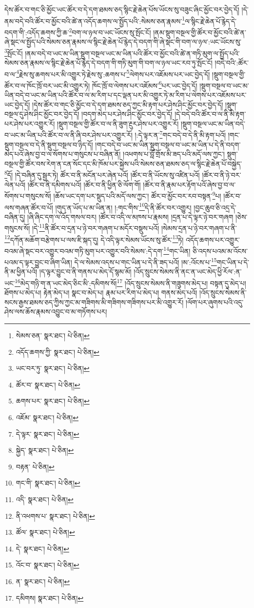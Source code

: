 དེས་ཚོར་བ་གང་ཅི་མྱོང་ཡང་ཚོར་བ་དེ་དག་ཐམས་ཅད་སྙིང་རྗེ་ཆེན་པོས་ཡོངས་སུ་བཟུང་ཞིང་མྱོང་བར་བྱེད་དོ། །དེ་ནམ་བདེ་བའི་ཚོར་བ་མྱོང་བའི་ཚེ་ན་འདོད་ཆགས་ལ་སྤྱོད་པའི་:སེམས་ཅན་རྣམས་\footnote{སེམས་ཅན་  སྣར་ཐང་།  པེ་ཅིན། }ལ་སྙིང་རྗེ་ཆེན་པོ་རྙེད་དེ་བདག་གི་:འདོད་ཆགས་ཀྱི་ཆ་\footnote{འདོད་ཆགས་ཀྱི་  སྣར་ཐང་།  པེ་ཅིན། }བག་ལ་ཉལ་བ་ཡང་ཡོངས་སུ་སྤོང་ངོ། །ནམ་སྡུག་བསྔལ་གྱི་ཚོར་བ་མྱོང་བའི་ཚེ་ན་ཞེ་སྡང་ལ་སྤྱོད་པའི་སེམས་ཅན་རྣམས་ལ་སྙིང་རྗེ་ཆེན་པོ་རྙེད་དེ་བདག་གི་ཞེ་སྡང་གི་བག་ལ་ཉལ་:ཡང་ཡོངས་སུ་\footnote{ཡང་བར་ཏུ་  སྣར་ཐང་།  པེ་ཅིན། }སྤོང་ངོ། །ནམ་བདེ་བ་ཡང་མ་ཡིན་སྡུག་བསྔལ་ཡང་མ་ཡིན་པའི་ཚོར་བ་མྱོང་བའི་ཚེ་ན་གཏི་མུག་ལ་སྤྱོད་པའི་སེམས་ཅན་རྣམས་ལ་སྙིང་རྗེ་ཆེན་པོ་རྙེད་དེ་བདག་གི་གཏི་མུག་གི་བག་ལ་ཉལ་ཡང་རབ་ཏུ་སྤོང་ངོ། །བདེ་བའི་:ཚོར་བ་ལ་\footnote{ཚོར་བ་  སྣར་ཐང་།  པེ་ཅིན། }རྗེས་སུ་ཆགས་པར་མི་འགྱུར་ཏེ་རྗེས་སུ་:ཆགས་པ་\footnote{ཆགས་པར་  སྣར་ཐང་།  པེ་ཅིན། }ལེགས་པར་འཇོམས་པར་ཡང་བྱེད་དོ། །སྡུག་བསྔལ་གྱི་ཚོར་བ་ལ་ཁོང་ཁྲོ་བར་ཡང་མི་འགྱུར་ཏེ། ཁོང་ཁྲོ་བ་ལེགས་པར་འཇོམས་\footnote{འཇོམ་  སྣར་ཐང་།  པེ་ཅིན། }པར་ཡང་བྱེད་དོ། །སྡུག་བསྔལ་བ་ཡང་མ་ཡིན་བདེ་བ་ཡང་མ་ཡིན་པའི་ཚོར་བ་ལ་མ་རིག་པ་དང་ལྡན་པར་མི་འགྱུར་ཏེ་མ་རིག་པ་ལེགས་པར་འཇོམས་པར་ཡང་བྱེད་དོ། །དེས་ཚོར་བ་གང་ཅི་མྱོང་བ་དེ་དག་ཐམས་ཅད་ཀྱང་མི་རྟག་པར་ཤེས་ཤིང་མྱོང་བར་བྱེད་དོ། །སྡུག་བསྔལ་དུ་ཤེས་ཤིང་མྱོང་བར་བྱེད་དོ། །བདག་མེད་པར་ཤེས་ཤིང་མྱོང་བར་བྱེད་དོ། །དེ་བདེ་བའི་ཚོར་བ་ལ་ནི་མི་རྟག་པར་ཤེས་པར་འགྱུར་རོ། །སྡུག་བསྔལ་གྱི་ཚོར་བ་ལ་ནི་ཟུག་རྔུར་ཤེས་པར་འགྱུར་རོ། །སྡུག་བསྔལ་ཡང་མ་ཡིན་བདེ་བ་ཡང་མ་ཡིན་པའི་ཚོར་བ་ལ་ནི་ཞི་བར་ཤེས་པར་འགྱུར་རོ། །:དེ་ལྟར་ན་\footnote{དེ་ལྟར་  སྣར་ཐང་།  པེ་ཅིན། }གང་བདེ་བ་དེ་ནི་མི་རྟག་པའོ། །གང་སྡུག་བསྔལ་བ་དེ་ནི་སྡུག་བསྔལ་བ་ཉིད་དོ། །གང་བདེ་བ་ཡང་མ་ཡིན་སྡུག་བསྔལ་བ་ཡང་མ་ཡིན་པ་དེ་ནི་བདག་མེད་པའོ་ཞེས་བྱ་བ་ལ་སོགས་པ་གསུངས་པ་བཞིན་ནོ། །འཕགས་པ་བློ་གྲོས་མི་ཟད་པའི་མདོ་ལས་ཀྱང་། སྡུག་བསྔལ་གྱི་ཚོར་བས་རེག་ན་ངན་སོང་དང་མི་ཁོམ་པར་སྐྱེས་པའི་སེམས་ཅན་ཐམས་ཅད་ལ་སྙིང་རྗེ་ཆེན་པོ་བསྐྱེད་\footnote{སྐྱེད་  སྣར་ཐང་།  པེ་ཅིན། }དོ། །དེ་བཞིན་དུ་སྦྱར་ཏེ། ཚོར་བ་ནི་མངོན་པར་ཞེན་པའོ། །ཚོར་བ་ནི་ཡོངས་སུ་འཛིན་པའོ། །ཚོར་བ་ནི་ཉེ་བར་ལེན་པའོ། །ཚོར་བ་ནི་དམིགས་པའོ། །ཚོར་བ་ནི་ཕྱིན་ཅི་ལོག་གོ། །ཚོར་བ་ནི་རྣམ་པར་རྟོག་པའོ་ཞེས་བྱ་བ་ལ་སོགས་པ་གསུངས་སོ། །ཆོས་ཡང་དག་པར་སྡུད་པའི་མདོ་ལས་ཀྱང་། ཚོར་བ་མྱོང་བར་རབ་བསྟན་\footnote{བརྟན་  པེ་ཅིན། }པ། །ཚོར་བ་ལས་གཞན་ཚོར་བ་པོ། །གུད་ན་ཡོད་པ་མ་ཡིན་ན། །:གང་གིས་\footnote{གང་གི་  སྣར་ཐང་།  པེ་ཅིན། }དེ་ནི་ཚོར་བར་འགྱུར། །བྱང་ཆུབ་ཅི་འདྲ་དེ་བཞིན་དུ། །ཞི་ཞིང་དག་ལ་འོད་གསལ་བར། །ཚོར་བ་འདི་ལ་མཁས་པ་རྣམས། །དྲན་པ་དེ་ལྟར་ཉེ་བར་གཞག །ཅེས་གསུངས་སོ། །དེ་\footnote{འདི་  སྣར་ཐང་།  པེ་ཅིན། }ནི་ཚོར་བ་དྲན་པ་ཉེ་བར་གཞག་པ་མདོར་བསྡུས་པའོ། །སེམས་དྲན་པ་ཉེ་བར་གཞག་པ་ནི་\footnote{ནི་འཕགས་པ་  སྣར་ཐང་།  པེ་ཅིན། }དཀོན་མཆོག་བརྩེགས་པ་ལས་ཇི་སྐད་དུ། དེ་འདི་ལྟར་སེམས་ཡོངས་སུ་ཚོར་\footnote{ཚོལ་  སྣར་ཐང་།  པེ་ཅིན། }ཏེ། འདོད་ཆགས་པར་འགྱུར་བའམ་ཞེ་སྡང་བར་འགྱུར་བའམ་གཏི་མུག་པར་འགྱུར་བའི་སེམས་:དེ་དག་\footnote{དེ་  སྣར་ཐང་།  པེ་ཅིན། }གང་ཡིན། ཅི་འདས་པའམ་མ་འོངས་པའམ་ད་ལྟར་བྱུང་བ་ཞིག་ཡིན། དེ་ལ་སེམས་འདས་པ་གང་ཡིན་པ་དེ་ནི་ཟད་པའོ། །མ་:འོངས་པ་\footnote{འོང་བ་  སྣར་ཐང་།  པེ་ཅིན། }གང་ཡིན་པ་དེ་ནི་མ་ཕྱིན་པའོ། །ད་ལྟར་བྱུང་བ་ནི་གནས་པ་མེད་དོ་སྙམ་མོ། །འོད་སྲུངས་སེམས་ནི་ནང་ན་ཡང་མེད་ཕྱི་རོལ་:ན་ཡང་\footnote{ན་  སྣར་ཐང་།  པེ་ཅིན། }མེད་གཉི་ག་ན་ཡང་མེད་ཅིང་མི་:དམིགས་སོ།\footnote{དམིགས།  སྣར་ཐང་།  པེ་ཅིན། } །འོད་སྲུངས་སེམས་ནི་གཟུགས་མེད་པ། བསྟན་དུ་མེད་པ། ཐོགས་པ་མེད་པ། རྟེན་མེད་པ། སྣང་བ་མེད་པ། རྣམ་པར་རིག་པ་མེད་པ། གནས་མེད་པའོ། །འོད་སྲུངས་སེམས་ནི་སངས་རྒྱས་ཐམས་ཅད་ཀྱིས་ཀྱང་མ་གཟིགས་མི་གཟིགས་གཟིགས་པར་མི་འགྱུར་རོ། །ལོག་པར་ཞུགས་པའི་འདུ་ཤེས་ལས་ཆོས་རྣམས་འབྱུང་བ་མ་གཏོགས་པར། 
